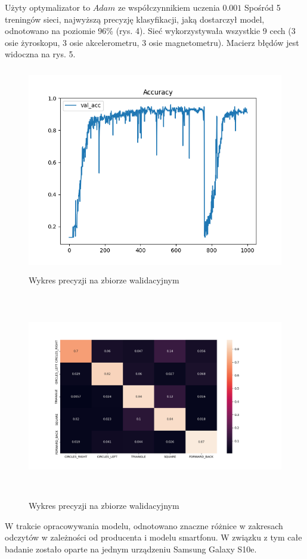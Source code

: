 \documentclass[10pt]{article}
\begin{document}
Użyty optymalizator to $Adam$ ze współczynnikiem uczenia $0.001$
 Spośród 5 treningów sieci, najwyższą precyzję klasyfikacji, jaką dostarczył model, odnotowano na poziomie 96\% (rys. 4). Sieć wykorzystywała wszystkie 9 cech (3 osie żyroskopu, 3 osie akcelerometru, 3 osie magnetometru). Macierz błędów jest widoczna na rys. 5.

 \begin{figure}[H]
  \includegraphics[height=9cm]{acc.png}
  \centering
  \caption{Wykres precyzji na zbiorze walidacyjnym}
\end{figure}

\begin{figure}[H]
  \includegraphics[height=9cm]{conf.png}
  \centering
  \caption{Wykres precyzji na zbiorze walidacyjnym}
\end{figure}

W trakcie opracowywania modelu, odnotowano znaczne różnice w zakresach odczytów w zależności od producenta i modelu smartfonu. W związku z tym całe badanie zostało oparte na jednym urządzeniu Samsung Galaxy S10e.
\end{document}
